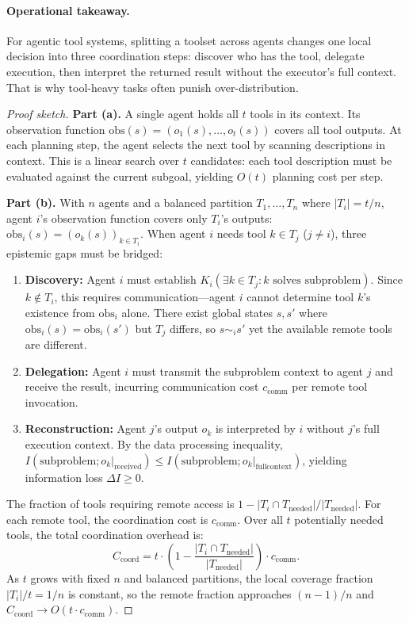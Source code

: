 \paragraph{Operational takeaway.}
For agentic tool systems, splitting a toolset across agents changes one local decision into three coordination steps: discover who has the tool, delegate execution, then interpret the returned result without the executor's full context. That is why tool-heavy tasks often punish over-distribution.

\begin{proof}[Proof sketch]
\textbf{Part (a).} A single agent holds all $t$ tools in its context. Its observation function $\mathrm{obs}(s) = (o_1(s), \ldots, o_t(s))$ covers all tool outputs. At each planning step, the agent selects the next tool by scanning descriptions in context. This is a linear search over $t$ candidates: each tool description must be evaluated against the current subgoal, yielding $O(t)$ planning cost per step.

\textbf{Part (b).} With $n$ agents and a balanced partition $T_1, \ldots, T_n$ where $|T_i| = t/n$, agent $i$'s observation function covers only $T_i$'s outputs: $\mathrm{obs}_i(s) = (o_k(s))_{k \in T_i}$. When agent $i$ needs tool $k \in T_j$ ($j \ne i$), three epistemic gaps must be bridged:

\begin{enumerate}
\item \textbf{Discovery:} Agent $i$ must establish $K_i(\exists k \in T_j : k \text{ solves subproblem})$. Since $k \notin T_i$, this requires communication---agent $i$ cannot determine tool $k$'s existence from $\mathrm{obs}_i$ alone. There exist global states $s, s'$ where $\mathrm{obs}_i(s) = \mathrm{obs}_i(s')$ but $T_j$ differs, so $s \sim_i s'$ yet the available remote tools are different.
\item \textbf{Delegation:} Agent $i$ must transmit the subproblem context to agent $j$ and receive the result, incurring communication cost $c_{\mathrm{comm}}$ per remote tool invocation.
\item \textbf{Reconstruction:} Agent $j$'s output $o_k$ is interpreted by $i$ without $j$'s full execution context. By the data processing inequality, $I(\text{subproblem}; o_k|_{\mathrm{received}}) \le I(\text{subproblem}; o_k|_{\mathrm{full context}})$, yielding information loss $\Delta I \ge 0$.
\end{enumerate}

The fraction of tools requiring remote access is $1 - |T_i \cap T_{\mathrm{needed}}|/|T_{\mathrm{needed}}|$. For each remote tool, the coordination cost is $c_{\mathrm{comm}}$. Over all $t$ potentially needed tools, the total coordination overhead is:
\[
C_{\mathrm{coord}} = t \cdot \left(1 - \frac{|T_i \cap T_{\mathrm{needed}}|}{|T_{\mathrm{needed}}|}\right) \cdot c_{\mathrm{comm}}.
\]
As $t$ grows with fixed $n$ and balanced partitions, the local coverage fraction $|T_i|/t = 1/n$ is constant, so the remote fraction approaches $(n-1)/n$ and $C_{\mathrm{coord}} \to O(t \cdot c_{\mathrm{comm}})$.


\end{proof}
